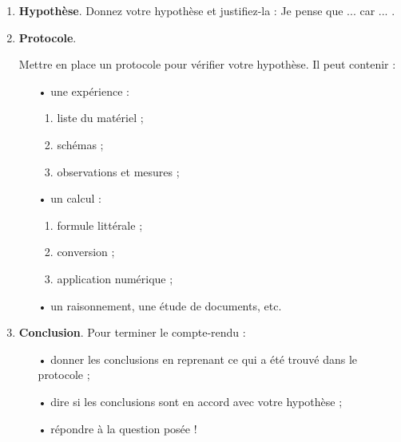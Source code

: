 \documentclass[12pt,a4paper]{article}
\begin{document}
\begin{enumerate}
\item \textbf{Hypothèse}. Donnez votre hypothèse et justifiez-la : \og Je pense que ... car ... \fg{}. \hfill \anarai{}

\item \textbf{Protocole}. \hfill \app{} \anarai{} \rea{}

Mettre en place un protocole pour vérifier votre hypothèse. Il peut contenir :
\vspace{-0.5\baselineskip}
\begin{multicols}{2}
\begin{itemize}
\item[•] une expérience :
\begin{enumerate}
\item liste du matériel ;
\item schémas ;
\item observations et mesures ;
\end{enumerate}
\item[•] un calcul :
\begin{enumerate}
\item formule littérale ;
\item conversion ;
\item application numérique ;
\end{enumerate}
\end{itemize}
\end{multicols}
\vspace{-1.\baselineskip}
\begin{itemize}
\item[•] un raisonnement, une étude de documents, etc.
\end{itemize}
\item \textbf{Conclusion}. Pour terminer le compte-rendu : \hfill \val{}
\begin{itemize}
\item[•] donner les conclusions en reprenant ce qui a été trouvé dans le protocole ;
\item[•] dire si les conclusions sont en accord avec votre hypothèse ;
\item[•] répondre à la question posée !
\end{itemize}
\end{enumerate}

\newpage

\end{document}
